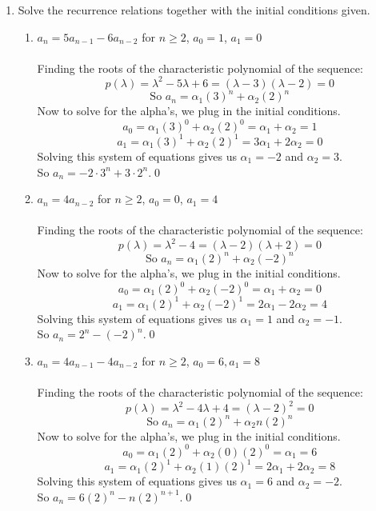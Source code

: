 \documentclass[12pt]{article}
\begin{document}
\begin{enumerate}
\begin{enumerate}
\end{enumerate}

\medskip

\item Solve the recurrence relations together with the initial conditions given.

\begin{enumerate}
\item $a_n = 5a_{n-1} - 6a_{n-2}$ for $n \geq 2$, $a_0=1$, $a_1 = 0$\\\\
Finding the roots of the characteristic polynomial of the sequence:
\[p(\lambda) = \lambda^2-5\lambda+6= (\lambda-3)(\lambda-2)=0\]
\[\text{So } a_n = \alpha_1 (3)^n + \alpha_2 (2)^n\]
Now to solve for the alpha's, we plug in the initial conditions.
\[a_0 = \alpha_1 (3)^0 + \alpha_2 (2)^0 = \alpha_1 + \alpha_2 = 1\]
\[a_1 = \alpha_1 (3)^1 + \alpha_2 (2)^1 = 3\alpha_1 + 2\alpha_2 = 0\]
Solving this system of equations gives us $\alpha_1 = -2$ and $\alpha_2 = 3$.\\
So $a_n = -2\cdot3^n + 3\cdot2^n$.\qed
\item $a_n = 4a_{n-2}$ for $n \geq 2$, $a_0=0$, $a_1=4$\\\\
Finding the roots of the characteristic polynomial of the sequence:
\[p(\lambda) = \lambda^2-4= (\lambda-2)(\lambda+2)=0\]
\[\text{So } a_n = \alpha_1 (2)^n + \alpha_2 (-2)^n\]
Now to solve for the alpha's, we plug in the initial conditions.
\[a_0 = \alpha_1 (2)^0 + \alpha_2 (-2)^0 = \alpha_1 + \alpha_2 = 0\]
\[a_1 = \alpha_1 (2)^1 + \alpha_2 (-2)^1 = 2\alpha_1 - 2\alpha_2 = 4\]
Solving this system of equations gives us $\alpha_1 = 1$ and $\alpha_2 = -1$.\\
So $a_n = 2^n - (-2)^n$.\qed
\item $a_n = 4a_{n-1} - 4a_{n-2}$ for $n \geq 2$, $a_0=6, a_1 = 8$\\\\
Finding the roots of the characteristic polynomial of the sequence:
\[p(\lambda) = \lambda^2 -4\lambda + 4 = (\lambda-2)^2=0\]
\[\text{So } a_n = \alpha_1 (2)^n + \alpha_2n(2)^n\]
Now to solve for the alpha's, we plug in the initial conditions.
\[a_0 = \alpha_1 (2)^0 + \alpha_2(0)(2)^0 = \alpha_1 = 6\]
\[a_1 = \alpha_1 (2)^1 + \alpha_2(1)(2)^1 = 2\alpha_1 + 2\alpha_2 = 8\]
Solving this system of equations gives us $\alpha_1 = 6$ and $\alpha_2 = -2$.\\
So $a_n = 6(2)^n-n(2)^{n+1}$.\qed

\end{enumerate}


\end{enumerate}
\end{document}
